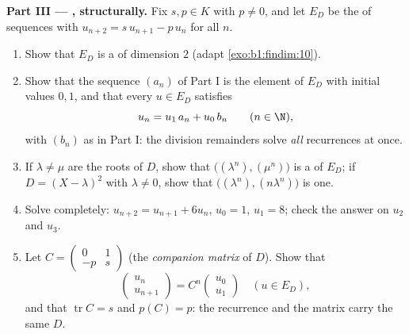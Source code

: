 \begin{problem}
\medskip
\noindent\textbf{Part III --- , structurally.}
Fix $s, p \in K$ with $p \neq 0$, and let $E_D$ be the  of
sequences with $u_{n+2} = s\,u_{n+1} - p\,u_n$ for all $n$.
\begin{enumerate}[resume]
  \item Show that $E_D$ is a  of dimension $2$
        (adapt \cref{exo:b1:findim:10}).
  \item Show that the sequence $(a_n)$ of Part I is the element
        of $E_D$ with initial values $0, 1$, and that every $u
        \in E_D$ satisfies
        \[
        u_n = u_1\,a_n + u_0\,b_n \qquad (n \in \N),
        \]
        with $(b_n)$ as in Part I: the division remainders solve
        \emph{all} recurrences at once.
  \item If $\lambda \neq \mu$ are the roots of $D$, show that
        $\bigl((\lambda^n), (\mu^n)\bigr)$ is a  of $E_D$;
        if $D = (X-\lambda)^2$ with $\lambda \neq 0$, show that
        $\bigl((\lambda^n), (n\lambda^n)\bigr)$ is one.
  \item Solve completely: $u_{n+2} = u_{n+1} + 6u_n$, $u_0 = 1$,
        $u_1 = 8$; check the answer on $u_2$ and $u_3$.
  \item Let $C = \begin{pmatrix} 0 & 1\\ -p & s\end{pmatrix}$
        (the \emph{companion matrix} of $D$). Show that
        \[
        \begin{pmatrix} u_{n}\\ u_{n+1}\end{pmatrix}
        = C^n \begin{pmatrix} u_0\\ u_1\end{pmatrix}
        \quad (u \in E_D),
        \]
        and that $\operatorname{tr} C = s$ and $p(C) = p$: the
        recurrence and the matrix carry the same  $D$.
\end{enumerate}


\end{problem}
